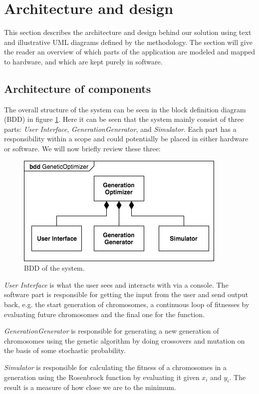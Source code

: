 \section{Architecture and design}\label{sec:archdesign}

This section describes the architecture and design behind our solution using text and illustrative UML diagrams defined by the methodology. The section will give the reader an overview of which parts of the application are modeled and mapped to hardware, and which are kept purely in software.

\subsection{Architecture of components}

The overall structure of the system can be seen in the block definition diagram (BDD) in figure \ref{fig:bdd}. Here it can be seen that the system mainly consist of three parts: \emph{User Interface}, \emph{GenerationGenerator}, and \emph{Simulator}. Each part has a responsibility within a scope and could potentially be placed in either hardware or software. We will now briefly review these three:

\begin{figure}[h!]
	\centering
	\includegraphics[width=0.6\linewidth]{../diagrams/bdd.png}
	\caption{BDD of the system.}
	\label{fig:bdd}
\end{figure}

\emph{User Interface} is what the user sees and interacts with via a console. The software part is responsible for getting the input from the user and send output back, e.g. the start generation of chromosomes, a continuous loop of fitnesses by evaluating future chromosomes and the final one for the function.

\emph{GenerationGenerator} is responsible for generating a new generation of chromosomes using the genetic algorithm by doing crossovers and mutation on the basis of some stochastic probability.

\emph{Simulator} is responsible for calculating the fitness of a chromosomes in a generation using the Rosenbrock function by evaluating it given $x_{i}$ and $y_{i}$. The result is a measure of how close we are to the minimum.

